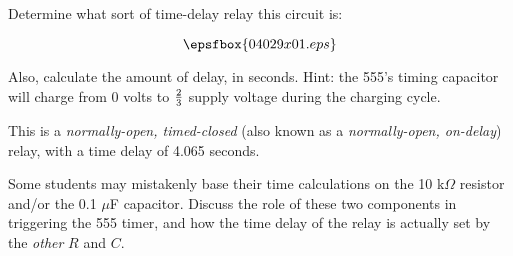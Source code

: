 

Determine what sort of time-delay relay this circuit is:

$$\epsfbox{04029x01.eps}$$

Also, calculate the amount of delay, in seconds.  Hint: the 555's timing capacitor will charge from 0 volts to $2 \over 3$ supply voltage during the charging cycle.

\vskip 10pt







This is a {\it normally-open, timed-closed} (also known as a {\it normally-open, on-delay}) relay, with a time delay of 4.065 seconds.







Some students may mistakenly base their time calculations on the 10 k$\Omega$ resistor and/or the 0.1 $\mu$F capacitor.  Discuss the role of these two components in triggering the 555 timer, and how the time delay of the relay is actually set by the {\it other} $R$ and $C$.




